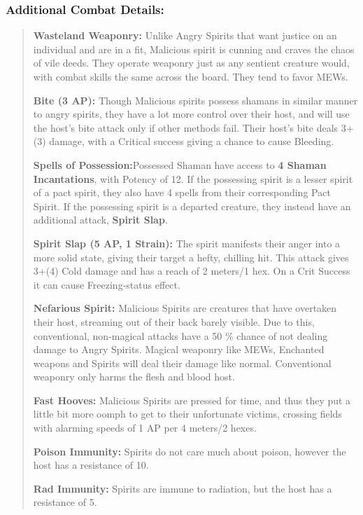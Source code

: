 \documentclass[11pt,a4paper,twocolumn]{book}
\begin{document}
	\subsubsection*{Additional Combat Details:}
	\begin{verse}
		\textbf{Wasteland Weaponry:} Unlike Angry Spirits that want justice on an individual and are in a fit, Malicious spirit is cunning and craves the chaos of vile deeds. They operate weaponry just as any sentient creature would, with combat skills the same across the board. They tend to favor MEWs.
		
		\textbf{Bite (3 AP):} Though Malicious spirits possess shamans in similar manner to angry spirits, they have a lot more control over their host, and will use the host's bite attack only if other methods fail. Their host's bite deals 3+(3) damage, with a Critical success giving a chance to cause Bleeding.
		
		\textbf{Spells of Possession:}Possessed Shaman have access to \textbf{4 Shaman Incantations}, with Potency of 12. If the possessing spirit is a lesser spirit of a pact spirit, they also have 4 spells from their corresponding Pact Spirit. If the possessing spirit is a departed creature, they instead have an additional attack, \textbf{Spirit Slap}.
		
		\textbf{Spirit Slap (5 AP, 1 Strain):} The spirit manifests their anger into a more solid state, giving their target a hefty, chilling hit. This attack gives 3+(4) Cold damage and has a reach of 2 meters/1 hex. On a Crit Success it can cause Freezing-status effect.
		
		\textbf{Nefarious Spirit:} Malicious Spirits are creatures that have overtaken their host, streaming out of their back barely visible. Due to this, conventional, non-magical attacks have a 50 \% chance of not dealing damage to Angry Spirits. Magical weaponry like MEWs, Enchanted weapons and Spirits will deal their damage like normal. Conventional weaponry only harms the flesh and blood host.
		
		\textbf{Fast Hooves:} Malicious Spirits are pressed for time, and thus they put a little bit more oomph to get to their unfortunate victims, crossing fields with alarming speeds of 1 AP per 4 meters/2 hexes.
		
		\textbf{Poison Immunity:} Spirits do not care much about poison, however the host has a resistance of 10.
		
		\textbf{Rad Immunity:} Spirits are immune to radiation, but the host has a resistance of 5.
		
	\end{verse}
	
\end{document}
